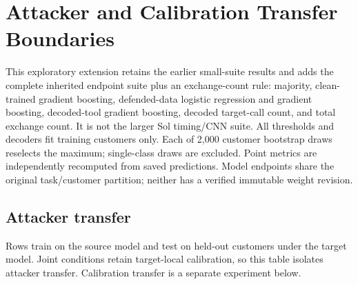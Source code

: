 \section{Attacker and Calibration Transfer Boundaries}\label{sec:transfer-matrices}

This exploratory extension retains the earlier small-suite results and adds the complete inherited endpoint suite plus an exchange-count rule: majority, clean-trained gradient boosting, defended-data logistic regression and gradient boosting, decoded-tool gradient boosting, decoded target-call count, and total exchange count. It is not the larger Sol timing/CNN suite. All thresholds and decoders fit training customers only. Each of 2,000 customer bootstrap draws reselects the maximum; single-class draws are excluded. Point metrics are independently recomputed from saved predictions. Model endpoints share the original task/customer partition; neither has a verified immutable weight revision.

\subsection{Attacker transfer}

Rows train on the source model and test on held-out customers under the target model. Joint conditions retain target-local calibration, so this table isolates attacker transfer. Calibration transfer is a separate experiment below.

